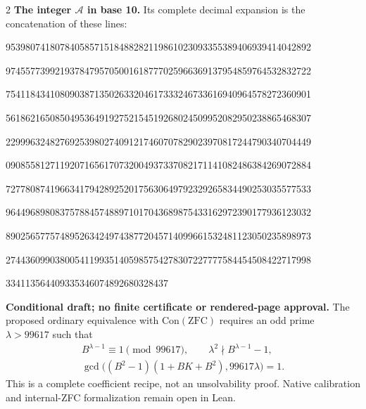 \documentclass[10pt]{article}
\begin{document}
\begin{multicols}{2}
\textbf{The integer $\mathcal A$ in base 10.}
Its complete decimal expansion is the concatenation of these lines:\par
\begingroup\fontsize{7.7}{8.2}\selectfont{}\par
95398074180784058571518488282119861023093355389406939414042892\par
97455773992193784795705001618777025966369137954859764532832722\par
75411843410809038713502633204617333246733616940964578272360901\par
56186216508504953649192752154519268024509952082950238865468307\par
22999632482769253980274091217460707829023970817244790340704449\par
09085581271192071656170732004937337082171141082486384269072884\par
72778087419663417942892520175630649792329265834490253035577533\par
96449689808375788457488971017043689875433162972390177936123032\par
89025657757489526342497438772045714099661532481123050235898973\par
27443609903800541199351405985754278307227777584454508422717998\par
334113564409335346074892680328437\par
\endgroup
\normalfont\fontsize{7.7}{8.2}\selectfont
\textbf{Conditional draft; no finite certificate or rendered-page approval.}
The proposed ordinary equivalence with $\mathrm{Con}(\mathrm{ZFC})$
requires an odd prime $\lambda>99617$ such that
\[
\begin{gathered}
B^{\lambda-1}\equiv1\pmod{99617},\qquad
\lambda^2\nmid B^{\lambda-1}-1,\\
\gcd\bigl((B^2-1)(1+BK+B^2),99617\lambda\bigr)=1.
\end{gathered}
\]
This is a complete coefficient recipe, not an unsolvability proof.
Native calibration and internal-ZFC formalization remain open in Lean.
\end{multicols}
\end{document}
